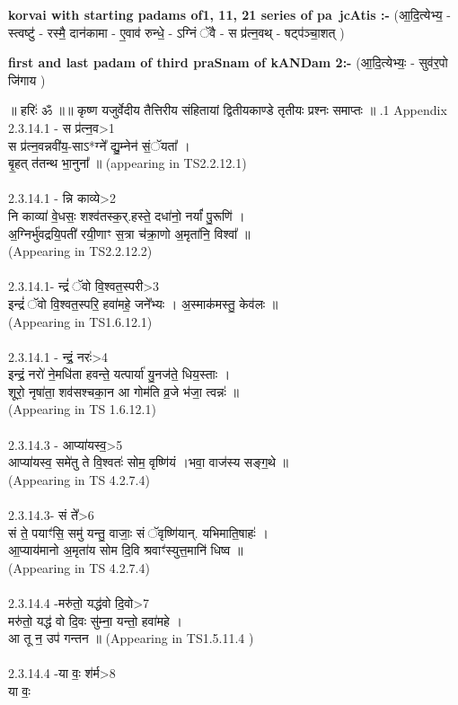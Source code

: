 \documentclass[17pt]{extarticle}
\begin{document}
        \textbf{korvai with starting padams of1, 11, 21 series of pa~jcAtis :-} \newline
        (आ॒दि॒त्येभ्य॒ - स्त्वष्टु॑ - रस्मै॒ दान॑कामा - ए॒वाव॑ रुन्धे॒ - ऽग्निं ॅवै - स प्र॑त्न॒वथ् - षट्प॑ञ्चा॒शत् ) \newline

        \textbf{first and last padam of third praSnam of kANDam 2:-} \newline
        (आ॒दि॒त्येभ्यः॒ - सुव॑र॒पो जि॑गाय ) \newline 

        
        ॥ हरिः॑ ॐ ॥॥ कृष्ण यजुर्वेदीय तैत्तिरीय संहितायां द्वितीयकाण्डे तृतीयः प्रश्नः समाप्तः ॥ \newline
        .1   Appendix\\2.3.14.1 - स प्र॑त्न॒व>1\\स प्र॑त्न॒वन्नवी॑य॒-साऽ*ग्ने᳚ द्यु॒म्नेन॑ सं॒ॅयता᳚ । \\बृ॒हत् त॑तन्थ भा॒नुना᳚ ॥ (appearing in TS2.2.12.1)\\\\2.3.14.1 - न्नि काव्ये>2\\नि काव्या॑ वे॒धसः॒ शश्व॑तस्क॒र्.हस्ते॒ दधा॑नो॒ नर्यां॑ पु॒रूणि॑ ।\\अ॒ग्निर्भु॑वद्रयि॒पती॑ रयी॒णाꣳ स॒त्रा च॑क्रा॒णो अ॒मृता॑नि॒ विश्वा᳚ ॥\\(Appearing in TS2.2.12.2)\\\\2.3.14.1- न्द्रं॑ ॅवो वि॒श्वत॒स्परी>3\\इन्द्रं॑ ॅवो वि॒श्वत॒स्परि॒ हवा॑महे॒ जने᳚भ्यः । अ॒स्माक॑मस्तु॒ केव॑लः ॥\\(Appearing in TS1.6.12.1)\\\\2.3.14.1 - न्द्रं॒ नरः॑>4\\इन्द्रं॒ नरो॑ ने॒मधि॑ता हवन्ते॒ यत्पार्या॑ यु॒नज॑ते॒ धिय॒स्ताः ।\\शूरो॒ नृषा॑ता॒ शव॑सश्चका॒न आ गोम॑ति व्र॒जे भ॑जा॒ त्वन्नः॑ ॥\\(Appearing in TS 1.6.12.1)\\\\2.3.14.3 - आप्या॑यस्व॒>5\\आप्या॑यस्व॒ समे॑तु ते वि॒श्वतः॑ सोम॒ वृष्णि॑यं ।भवा॒ वाज॑स्य सङ्ग॒थे ॥\\(Appearing in TS 4.2.7.4)\\\\2.3.14.3- सं ते᳚>6\\सं ते॒ पयाꣳ॑सि॒ समु॑ यन्तु॒ वाजाः॒ सं ॅवृष्णि॑यान्. यभिमाति॒षाहः॑ ।\\आ॒प्याय॑मानो अ॒मृता॑य सोम दि॒वि श्रवाꣳ॑स्युत्त॒मानि॑ धिष्व ॥\\(Appearing in TS 4.2.7.4)\\\\2.3.14.4 -मरु॑तो॒ यद्ध॑वो दि॒वो>7\\मरु॑तो॒ यद्ध॑ वो दि॒वः सु॑म्ना॒ यन्तो॒ हवा॑महे । \\आ तू न॒ उप॑ गन्तन ॥ (Appearing in TS1.5.11.4 )\\\\2.3.14.4 -या वः॒ श॑र्म>8\\या वः॒ 
\end{document}
